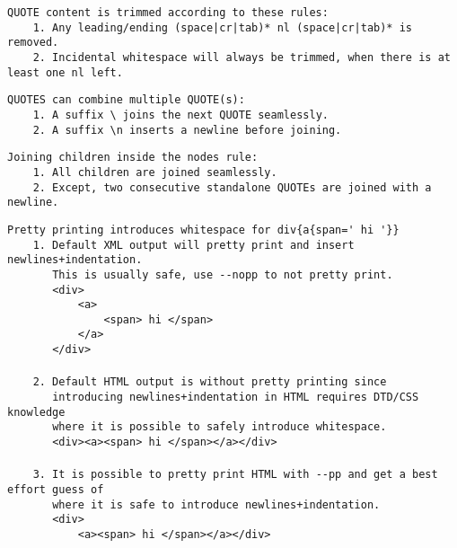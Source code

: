 \documentclass[10pt,a4paper]{article}
\begin{document}
\vspace{5mm}

\verb|QUOTE content is trimmed according to these rules:|\\
\verb!    1. Any leading/ending (space|cr|tab)* nl (space|cr|tab)* is removed.! \\
\verb|    2. Incidental whitespace will always be trimmed, when there is at least one nl left.|

\vspace{5mm}

\verb|QUOTES can combine multiple QUOTE(s):|\\
\verb|    1. A suffix \ joins the next QUOTE seamlessly.|\\
\verb|    2. A suffix \n inserts a newline before joining.|

\vspace{5mm}

\verb|Joining children inside the nodes rule:|\\
\verb|    1. All children are joined seamlessly.|\\
\verb|    2. Except, two consecutive standalone QUOTEs are joined with a newline.|

\vspace{5mm}

\verb|Pretty printing introduces whitespace for div{a{span=' hi '}}|\\
\verb|    1. Default XML output will pretty print and insert newlines+indentation.|\\
\verb|       This is usually safe, use --nopp to not pretty print.|\\
\verb|       <div>|\\
\verb|           <a>|\\
\verb|               <span> hi </span>|\\
\verb|           </a>|\\
\verb|       </div>|\\
\\
\verb|    2. Default HTML output is without pretty printing since|\\
\verb|       introducing newlines+indentation in HTML requires DTD/CSS knowledge|\\
\verb|       where it is possible to safely introduce whitespace.|\\
\verb|       <div><a><span> hi </span></a></div>|\\
\\
\verb|    3. It is possible to pretty print HTML with --pp and get a best effort guess of|\\
\verb|       where it is safe to introduce newlines+indentation.|\\
\verb|       <div>|\\
\verb|           <a><span> hi </span></a></div>|\\
\end{document}
